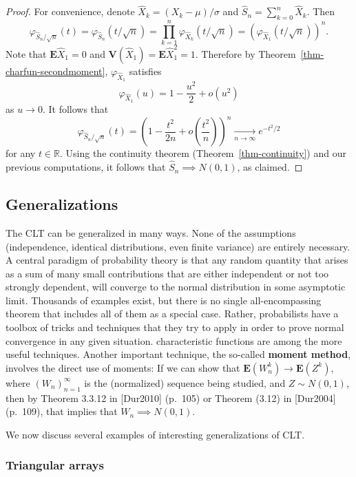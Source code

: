 \documentclass[12pt]{article}
\newcommand{\R}{\mathbb{R}}
\newcommand{\expec}{\mathbf{E}}
\newcommand{\var}{\mathbf{V}}
\theoremstyle{example}
\begin{document}
\begin{proof} For convenience, denote $\hat{X}_k = (X_k - \mu)/\sigma$ and $\hat{S}_n = \sum_{k=0}^n \hat{X}_k$. 
Then
$$ \varphi_{\hat{S}_n/\sqrt{n}}(t) = \varphi_{\hat{S}_n}(t/\sqrt{n})
= \prod_{k=1}^n \varphi_{\hat{X}_k}(t/\sqrt{n}) = \left(\varphi_{\hat{X}_1}(t/\sqrt{n})\right)^n.
$$
Note that $\expec \hat{X}_1 = 0$ and $\var(\hat{X}_1)=\expec \hat{X}_1^2 = 1$. Therefore by Theorem~\ref{thm-charfun-secondmoment}, $\varphi_{\hat{X}_1}$ satisfies
$$ \varphi_{\hat{X}_1}(u) = 1 - \frac{u^2}{2} + o(u^2) $$
as $u\to0$. It follows that
$$ \varphi_{\hat{S}_n/\sqrt{n}}(t) = \left(1 - \frac{t^2}{2n} + o\left(\frac{t^2}{n}\right) \right)^n \xrightarrow[n\to\infty]{} e^{-t^2/2}
$$
for any $t\in\R$. Using the continuity theorem (Theorem~\ref{thm-continuity}) and our previous computations, it follows that $\hat{S}_n \implies N(0,1)$, as claimed.
\end{proof}

\subsection{Generalizations}

The CLT can be generalized in many ways. None of the assumptions (independence, identical distributions, even finite variance) are entirely necessary. A central paradigm of probability theory is that any random quantity that arises as a sum of many small contributions that are either independent or not too strongly dependent, will converge to the normal distribution in some asymptotic limit. Thousands of examples exist, but there is no single all-encompassing theorem that includes all of them as a special case. Rather, probabilists have a toolbox of tricks and techniques that they try to apply in order to prove normal convergence in any given situation. characteristic functions are among the more useful techniques. Another important technique, the so-called \textbf{moment method}, involves the direct use of moments: If we can show that $\expec(W_n^k)\to \expec(Z^k)$, where $(W_n)_{n=1}^\infty$ is the (normalized) sequence being studied, and $Z\sim N(0,1)$, then by Theorem 3.3.12 in [Dur2010] (p.\ 105) or Theorem (3.12) in [Dur2004] (p.\ 109), that implies that $W_n\implies N(0,1)$.

We now discuss several examples of interesting generalizations of CLT.

\subsubsection{Triangular arrays}
\end{document}
